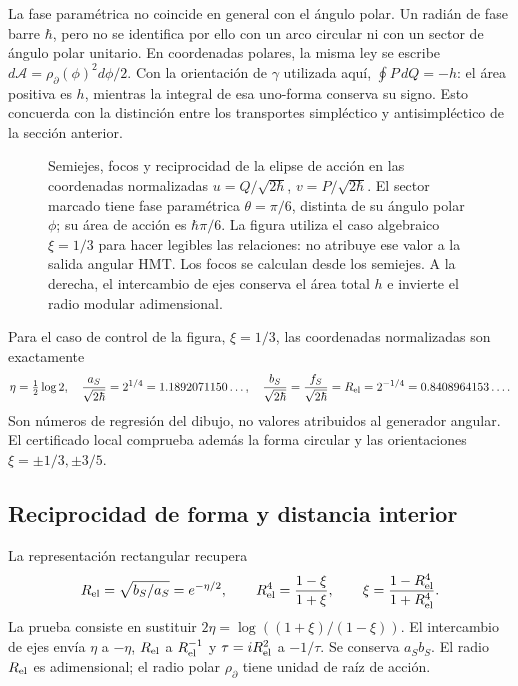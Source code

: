 La fase paramétrica no coincide en general con el ángulo polar. Un radián
de fase barre \(\hbar\), pero no se identifica por ello con un arco
circular ni con un sector de ángulo polar unitario. En coordenadas polares,
la misma ley se escribe
\(d\mathcal A=\rho_{\partial}(\phi)^2d\phi/2\).
Con la orientación de \(\gamma\) utilizada aquí,
\(\oint P\,dQ=-h\): el área positiva es \(h\), mientras la
integral de esa uno-forma conserva su signo. Esto concuerda con la
distinción entre los transportes simpléctico y antisimpléctico de la
sección anterior.

\begin{figure}[htbp]
 \centering
 
 \caption{Semiejes, focos y reciprocidad de la elipse de acción en las
 coordenadas normalizadas \(u=Q/\sqrt{2\hbar}\),
 \(v=P/\sqrt{2\hbar}\). El sector marcado tiene fase paramétrica
 \(\theta=\pi/6\), distinta de su ángulo polar \(\phi\); su área
 de acción es \(\hbar\pi/6\). La figura utiliza el caso algebraico
 \(\xi=1/3\) para hacer legibles las relaciones: no atribuye ese valor
 a la salida angular HMT. Los focos se calculan desde los semiejes.
 A la derecha, el intercambio de ejes conserva el área total \(h\)
 e invierte el radio modular adimensional.}
 \label{fig:ii-elipse-calculada}
\end{figure}

Para el caso de control de la figura, \(\xi=1/3\), las coordenadas
normalizadas son exactamente
\[
 \eta=\tfrac12\log2,\quad
 \frac{a_S}{\sqrt{2\hbar}}=2^{1/4}=1.1892071150\ldots,\quad
 \frac{b_S}{\sqrt{2\hbar}}=
 \frac{f_S}{\sqrt{2\hbar}}=R_{\rm el}=2^{-1/4}=0.8408964153\ldots.
\]
Son números de regresión del dibujo, no valores atribuidos al generador
angular. El certificado local comprueba además la forma circular y las
orientaciones \(\xi=\pm1/3,\pm3/5\).

\subsection{Reciprocidad de forma y distancia interior}

La representación rectangular recupera
\begin{equation}
 R_{\rm el}=\sqrt{b_S/a_S}=e^{-\eta/2},\qquad
 R_{\rm el}^4=\frac{1-\xi}{1+\xi},\qquad
 \xi=\frac{1-R_{\rm el}^4}{1+R_{\rm el}^4}.
 \label{eq:ii-elipse-reciproca}
\end{equation}
La prueba consiste en sustituir
\(2\eta=\log((1+\xi)/(1-\xi))\). El intercambio de ejes
envía \(\eta\) a \(-\eta\), \(R_{\rm el}\) a
\(R_{\rm el}^{-1}\) y \(\tau=iR_{\rm el}^2\) a \(-1/\tau\).
Se conserva \(a_Sb_S\). El radio \(R_{\rm el}\) es adimensional;
el radio polar \(\rho_{\partial}\) tiene unidad de raíz de acción.

